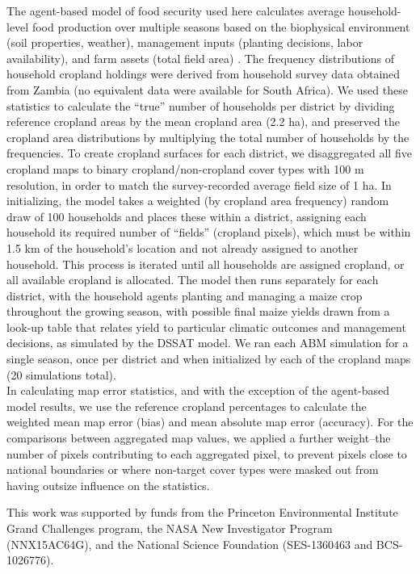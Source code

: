 \documentclass{pnastwo}
\begin{document}
\begin{article}
\begin{materials}
\indent The agent-based model of food security used here calculates average household-level food production over multiple seasons based on the biophysical environment (soil properties, weather), management inputs (planting decisions, labor availability), and farm assets (total field area) \cite{chen_dependency_2013}. The frequency distributions of household cropland holdings were derived from household survey data obtained from Zambia (no equivalent data were available for South Africa). We used these statistics to calculate the ``true'' number of households per district by dividing reference cropland areas by the mean cropland area (2.2 ha), and preserved the cropland area distributions by multiplying the total number of households by the frequencies. To create cropland surfaces for each district, we disaggregated all five cropland maps to binary cropland/non-cropland cover types with 100 m resolution, in order to match the survey-recorded average field size of 1 ha. In initializing, the model takes a weighted (by cropland area frequency) random draw of 100 households and places these within a district, assigning each household its required number of ``fields'' (cropland pixels), which must be within 1.5 km of the household's location and not already assigned to another household. This process is iterated until all households are assigned cropland, or all available cropland is allocated. The model then runs separately for each district, with the household agents planting and managing a maize crop throughout the growing season, with possible final maize yields drawn from a look-up table that relates yield to particular climatic outcomes and management decisions, as simulated by the DSSAT model. We ran each ABM simulation for a single season, once per district and when initialized by each of the cropland maps (20 simulations total).\\
\indent In calculating map error statistics, and with the exception of the agent-based model results, we use the reference cropland percentages to calculate the weighted mean map error (bias) and mean absolute map error (accuracy). For the comparisons between aggregated map values, we applied a further weight--the number of pixels contributing to each aggregated pixel, to prevent pixels close to national boundaries or where non-target cover types were masked out from having outsize influence on the statistics. 

\end{materials}



\begin{acknowledgments}
This work was supported by funds from the Princeton Environmental Institute Grand Challenges program, the NASA New Investigator Program
(NNX15AC64G), and the National Science Foundation (SES-1360463 and BCS-1026776).
\end{acknowledgments}


 
{\footnotesize }

\end{article}
\end{document}

